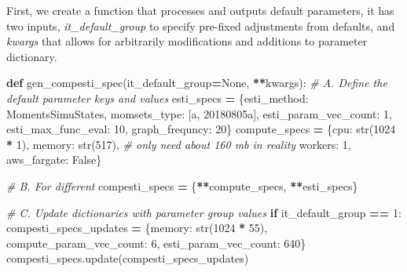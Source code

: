 \documentclass[
]{book}
\newenvironment{Shaded}{\begin{snugshade}}{\end{snugshade}}
\newcommand{\BuiltInTok}[1]{#1}
\newcommand{\CommentTok}[1]{\textcolor[rgb]{0.56,0.35,0.01}{\textit{#1}}}
\newcommand{\ControlFlowTok}[1]{\textcolor[rgb]{0.13,0.29,0.53}{\textbf{#1}}}
\newcommand{\DecValTok}[1]{\textcolor[rgb]{0.00,0.00,0.81}{#1}}
\newcommand{\KeywordTok}[1]{\textcolor[rgb]{0.13,0.29,0.53}{\textbf{#1}}}
\newcommand{\NormalTok}[1]{#1}
\newcommand{\OperatorTok}[1]{\textcolor[rgb]{0.81,0.36,0.00}{\textbf{#1}}}
\newcommand{\StringTok}[1]{\textcolor[rgb]{0.31,0.60,0.02}{#1}}
\newcommand{\VariableTok}[1]{\textcolor[rgb]{0.00,0.00,0.00}{#1}}
\begin{document}
First, we create a function that processes and outputs default parameters, it has two inputs, \emph{it\_default\_group} to specify pre-fixed adjustments from defaults, and \emph{kwargs} that allows for arbitrarily modifications and additions to parameter dictionary.

\begin{Shaded}
\begin{Highlighting}[]
\KeywordTok{def}\NormalTok{ gen\_compesti\_spec(it\_default\_group}\OperatorTok{=}\VariableTok{None}\NormalTok{, }\OperatorTok{**}\NormalTok{kwargs):}
    \CommentTok{\# A. Define the default parameter keys and values}
\NormalTok{    esti\_specs }\OperatorTok{=}\NormalTok{ \{}\StringTok{\textquotesingle{}esti\_method\textquotesingle{}}\NormalTok{: }\StringTok{\textquotesingle{}MomentsSimuStates\textquotesingle{}}\NormalTok{,}
                  \StringTok{\textquotesingle{}momsets\_type\textquotesingle{}}\NormalTok{: [}\StringTok{\textquotesingle{}a\textquotesingle{}}\NormalTok{, }\StringTok{\textquotesingle{}20180805a\textquotesingle{}}\NormalTok{],}
                  \StringTok{\textquotesingle{}esti\_param\_vec\_count\textquotesingle{}}\NormalTok{: }\DecValTok{1}\NormalTok{,}
                  \StringTok{\textquotesingle{}esti\_max\_func\_eval\textquotesingle{}}\NormalTok{: }\DecValTok{10}\NormalTok{,}
                  \StringTok{\textquotesingle{}graph\_frequncy\textquotesingle{}}\NormalTok{: }\DecValTok{20}\NormalTok{\}}
\NormalTok{    compute\_specs }\OperatorTok{=}\NormalTok{ \{}\StringTok{\textquotesingle{}cpu\textquotesingle{}}\NormalTok{: }\BuiltInTok{str}\NormalTok{(}\DecValTok{1024} \OperatorTok{*} \DecValTok{1}\NormalTok{),}
                     \StringTok{\textquotesingle{}memory\textquotesingle{}}\NormalTok{: }\BuiltInTok{str}\NormalTok{(}\DecValTok{517}\NormalTok{),  }\CommentTok{\# only need about 160 mb in reality}
                     \StringTok{\textquotesingle{}workers\textquotesingle{}}\NormalTok{: }\DecValTok{1}\NormalTok{,}
                     \StringTok{\textquotesingle{}aws\_fargate\textquotesingle{}}\NormalTok{: }\VariableTok{False}\NormalTok{\}}

    \CommentTok{\# B. For different}
\NormalTok{    compesti\_specs }\OperatorTok{=}\NormalTok{ \{}\OperatorTok{**}\NormalTok{compute\_specs, }\OperatorTok{**}\NormalTok{esti\_specs\}}

    \CommentTok{\# C. Update dictionaries with parameter group values}
    \ControlFlowTok{if}\NormalTok{ it\_default\_group }\OperatorTok{==} \DecValTok{1}\NormalTok{:}
\NormalTok{        compesti\_specs\_updates }\OperatorTok{=}\NormalTok{ \{}\StringTok{\textquotesingle{}memory\textquotesingle{}}\NormalTok{: }\BuiltInTok{str}\NormalTok{(}\DecValTok{1024} \OperatorTok{*} \DecValTok{55}\NormalTok{),}
                                  \StringTok{\textquotesingle{}compute\_param\_vec\_count\textquotesingle{}}\NormalTok{: }\DecValTok{6}\NormalTok{,}
                                  \StringTok{\textquotesingle{}esti\_param\_vec\_count\textquotesingle{}}\NormalTok{: }\DecValTok{640}\NormalTok{\}}
\NormalTok{        compesti\_specs.update(compesti\_specs\_updates)}


\end{Highlighting}
\end{Shaded}
\end{document}
